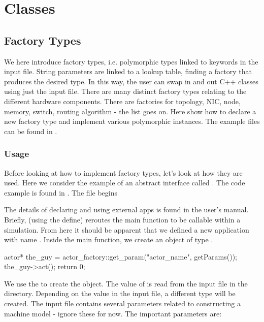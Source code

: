 
\chapter{\sstmacro Classes}\label{chapter:classes}

\section{Factory Types}\label{sec:factory}
We here introduce factory types, i.e. polymorphic types linked to keywords in the input file.
String parameters are linked to a lookup table, finding a factory that produces the desired type.
In this way, the user can swap in and out C++ classes using just the input file.
There are many distinct factory types relating to the different hardware components.
There are factories for topology, NIC, node, memory, switch, routing algorithm - the list goes on.
Here show how to declare a new factory type and implement various polymorphic instances.
The example files can be found in .

\subsection{Usage}\label{subsec:usage}
Before looking at how to implement factory types, let's look at how they are used.
Here we consider the example of an abstract interface called .
The code example is found in . The file begins

\begin{CppCode}
#include <sstmac/skeleton.h>
#include "actor.h"

namespace sstmac {
    namespace tutorial {

#define sstmac_app_name rob_reiner

int main(int argc, char **argv)
{
\end{CppCode}
The details of declaring and using external apps is found in the user's manual.
Briefly, \sstmacro (using the  define) reroutes the main function to be callable within a simulation.
From here it should be apparent that we defined a new application with name .
Inside the main function, we create an object of type .

\begin{CppCode}
actor* the_guy = actor_factory::get_param("actor_name", getParams());
the_guy->act();
return 0;
\end{CppCode}
We use the  to create the object.
The value of  is read from the input file  in the directory.
Depending on the value in the input file, a different type will be created.
The input file contains several parameters related to constructing a machine model - ignore these for now.
The important parameters are:

